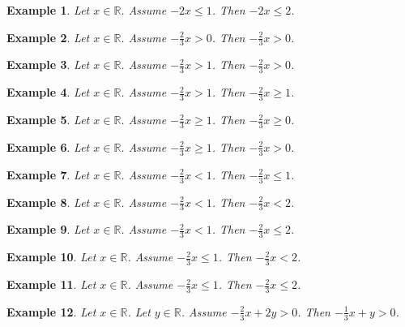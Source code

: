 \documentclass{article}
\newtheorem{example}{Example}
\begin{document}
\begin{example}
Let $x\in\mathbb{R}$. Assume $-2x\le 1$. Then $-2x\le 2$.
\end{example}


\begin{example}
Let $x\in\mathbb{R}$. Assume $-\frac{2}{3}x>0$. Then $-\frac{2}{3}x>0$.
\end{example}

\begin{example}
Let $x\in\mathbb{R}$. Assume $-\frac{2}{3}x>1$. Then $-\frac{2}{3}x>0$.
\end{example}

\begin{example}
Let $x\in\mathbb{R}$. Assume $-\frac{2}{3}x>1$. Then $-\frac{2}{3}x\ge 1$.
\end{example}

\begin{example}
Let $x\in\mathbb{R}$. Assume $-\frac{2}{3}x\ge 1$. Then $-\frac{2}{3}x\ge 0$.
\end{example}

\begin{example}
Let $x\in\mathbb{R}$. Assume $-\frac{2}{3}x\ge 1$. Then $-\frac{2}{3}x> 0$.
\end{example}

\begin{example}
Let $x\in\mathbb{R}$. Assume $-\frac{2}{3}x<1$. Then $-\frac{2}{3}x\le 1$.
\end{example}

\begin{example}
Let $x\in\mathbb{R}$. Assume $-\frac{2}{3}x<1$. Then $-\frac{2}{3}x<2$.
\end{example}

\begin{example}
Let $x\in\mathbb{R}$. Assume $-\frac{2}{3}x<1$. Then $-\frac{2}{3}x\le 2$.
\end{example}

\begin{example}
Let $x\in\mathbb{R}$. Assume $-\frac{2}{3}x\le 1$. Then $-\frac{2}{3}x<2$.
\end{example}

\begin{example}
Let $x\in\mathbb{R}$. Assume $-\frac{2}{3}x\le 1$. Then $-\frac{2}{3}x\le 2$.
\end{example}


\begin{example}
Let $x\in\mathbb{R}$. Let $y\in\mathbb{R}$. Assume $-\frac{2}{3}x+2y>0$. Then $-\frac{1}{3}x+y>0$.
\end{example}
\end{document}
